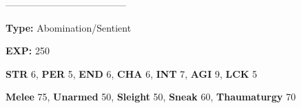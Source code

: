 \documentclass[11pt,a4paper,twocolumn]{book}
\begin{document}
%	
%	
%	

%		
	
	--------------------------------------
	
	\noindent
	\textbf{Type:} Abomination/Sentient
	
	\noindent
	\textbf{EXP:} 250
	
	\noindent
	\textbf{STR} 6, \textbf{PER} 5, \textbf{END} 6, \textbf{CHA} 6, \textbf{INT} 7, \textbf{AGI} 9, \textbf{LCK} 5
	
	\noindent
	\textbf{Melee} 75, \textbf{Unarmed} 50, \textbf{Sleight} 50, \textbf{Sneak} 60, \textbf{Thaumaturgy} 70
	
\end{document}
